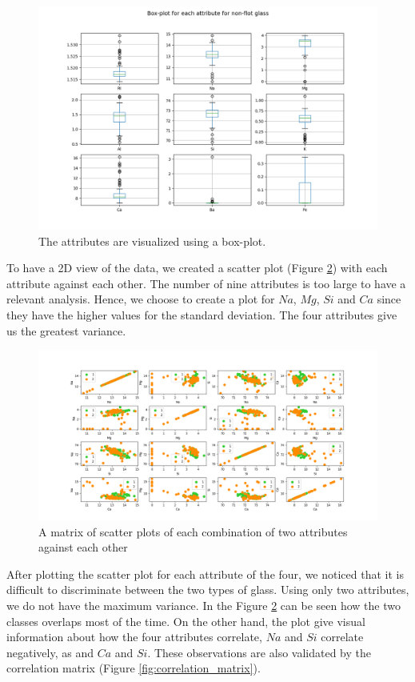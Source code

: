 \documentclass[12pt]{article}
\begin{document}
    \begin{figure}[H]
        \centering
    	\includegraphics[width=\linewidth]{image/box-plot__for_each_attribute_for_non-float.png}
    	\caption{The attributes are visualized using a box-plot.}
    	\label{fig:box_plot_non_float}
    \end{figure}
    
To have a 2D view of the data, we created a scatter plot (Figure \ref{fig:scatter}) with each attribute against each other. The number of nine attributes is too large to have a relevant analysis. Hence, we choose to create a plot for $Na$, $Mg$, $Si$ and $Ca$ since they have the higher values for the standard deviation. The four attributes give us the greatest variance.
    
    \begin{figure}[H]
        \centering
    	\includegraphics[width=\linewidth]{image/scatter_plot.png}
    	\caption{A matrix of scatter plots of each combination of two attributes against each other}
    	\label{fig:scatter}
    \end{figure}
After plotting the scatter plot for each attribute of the four, we noticed that it is difficult to discriminate between the two types of glass. Using only two attributes, we do not have the maximum variance. In the Figure \ref{fig:scatter} can be seen how the two classes overlaps most of the time. On the other hand, the plot give visual information about how the four attributes correlate, $Na$ and $Si$ correlate negatively, as and $Ca$ and $Si$. These observations are also validated by the correlation matrix (Figure \ref{fig:correlation_matrix}).
    
\end{document}
